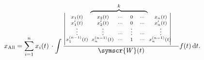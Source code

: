\documentclass[UTF8,9pt]{article}
\begin{document}
\setlength{\lineskip}{5pt}
\setlength{\lineskiplimit}{2.5pt}
\ExplSyntaxOn
\makeatletter

\newcommand\phantomHeight[1]{\rule[#1]{0pt}{0pt}}
\newcommand\phantomDepth[1]{\rule[-#1]{0pt}{0pt}}

\newcommand\drawAboveDelimiter{\drawDelimiter{north}}
\newcommand\drawBelowDelimiter{\drawDelimiter{south}}

\def\drawDelimiter#1#2#3#4#5{
  \begin{tikzpicture}
    \node[outer~ sep=0pt, inner~ sep=0pt, 
      draw=none, fill=none, #5, rotate=-90] 
      at ($ (#3.#1)!.5!(#4.#1) $)
    {
      {\nullfont\pgf@process{
        \pgfpointdiff
          {\pgfpointanchor{nm - \int_use:N\g__nm_env_int - #3 -large}{west}}
          {\pgfpointanchor{nm - \int_use:N\g__nm_env_int - #4 -large}{east}}
      }}
      $\left.\vcenter{\nullfont\hrule height .5\pgf@x depth .5\pgf@x width0pt}\right#2$
    };
  \end{tikzpicture}
}

\makeatother
\ExplSyntaxOff

\[
    x_{\rm All}= \sum\limits_{i=1}^{n} x_i(t) \, \cdot \int 	\dfrac{{\scriptstyle	
    \begin{vmatrix}
\scriptstyle \scriptstyle x_1(t) & \scriptstyle x_2(t)         & \scriptstyle \cdots & \scriptstyle 0                                & \scriptstyle \cdots & \scriptstyle x_n(t)         \\[-3pt]
\scriptstyle x_1'(t)             & \scriptstyle x_2'(t)        & \scriptstyle \cdots & \scriptstyle 0                                & \scriptstyle \cdots & \scriptstyle x_n'(t)        \\[-3pt]
\scriptstyle \vdots              & \scriptstyle \vdots         & \scriptstyle \cdots & \scriptstyle \vdots                           & \scriptstyle \cdots & \scriptstyle \vdots         \\[-3pt]
\scriptstyle x_1^{(n-1)}(t)     &\!\! \!\scriptstyle x_n^{(n-1)}(t) \!\!\!& \scriptstyle \cdots & \scriptstyle 1                                & \scriptstyle \cdots &\!\! \!\scriptstyle x_n^{(n-1)}(t) \!\!\\[3pt]
\end{vmatrix}\kern-4em\raisebox{1.8em}{$\kern-8em\overset{k}{\overbrace{\phantom{zzxvxvxvxx3wixcb}}}$\kern 4.6em}}}{\symscr{W} (t)}f(t) \,\mathrm{d}t
.\]
\end{document}
